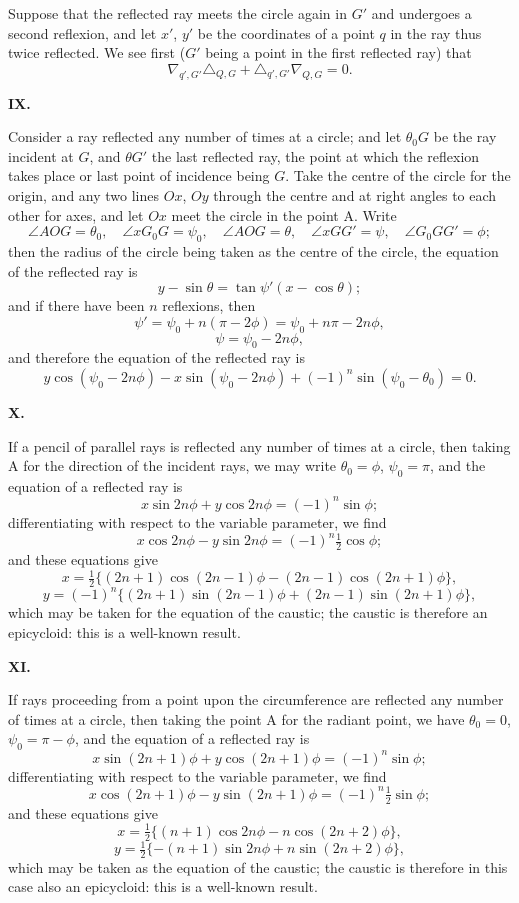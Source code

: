 \documentclass[11pt,a4paper]{book}
\begin{document}
\begin{center}
Suppose that the reflected ray meets the circle again in $G'$ and undergoes a
second reflexion, and let $x'$, $y'$ be the coordinates of a point $q$ in the ray thus
twice reflected. We see first ($G'$ being a point in the first reflected ray) that
\[\nabla_{q',G'}\triangle_{Q,G} + \triangle_{q',G'}\nabla_{Q,G} = 0.\]

\medskip
\noindent\textbf{IX.}

Consider a ray reflected any number of times at a circle; and let $\theta_0G$
be the ray incident at $G$, and $\theta G'$ the last reflected ray, the point at which
the reflexion takes place or last point of incidence being $G$. Take the centre of
the circle for the origin, and any two lines $Ox$, $Oy$ through the centre and at
right angles to each other for axes, and let $Ox$ meet the circle in the point A.
Write
\[\angle AOG = \theta_0,\quad \angle xG_0G = \psi_0,\quad \angle AOG = \theta,\quad \angle xGG' = \psi,\quad \angle G_0GG' = \phi;\]
then the radius of the circle being taken as the centre of the circle, the equation
of the reflected ray is
\[y - \sin\theta = \tan\psi'(x - \cos\theta);\]
and if there have been $n$ reflexions, then
\[\psi' = \psi_0 + n(\pi - 2\phi) = \psi_0 + n\pi - 2n\phi,\]
\[\psi = \psi_0 - 2n\phi,\]
and therefore the equation of the reflected ray is
\[y\cos(\psi_0 - 2n\phi) - x\sin(\psi_0 - 2n\phi) + (-1)^n\sin(\psi_0 - \theta_0) = 0.\]

\medskip
\noindent\textbf{X.}

If a pencil of parallel rays is reflected any number of times at a circle, then
taking A for the direction of the incident rays, we may write $\theta_0 = \phi$,
$\psi_0 = \pi$, and the equation of a reflected ray is
\[x\sin 2n\phi + y\cos 2n\phi = (-1)^n\sin\phi;\]
differentiating with respect to the variable parameter, we find
\[x\cos 2n\phi - y\sin 2n\phi = (-1)^n\tfrac{1}{2}\cos\phi;\]
and these equations give
\[x = \tfrac{1}{2}\{(2n+1)\cos(2n-1)\phi - (2n-1)\cos(2n+1)\phi\},\]
\[y = (-1)^n\{(2n+1)\sin(2n-1)\phi + (2n-1)\sin(2n+1)\phi\},\]
which may be taken for the equation of the caustic; the caustic is therefore an
epicycloid: this is a well-known result.

\medskip
\noindent\textbf{XI.}

If rays proceeding from a point upon the circumference are reflected any
number of times at a circle, then taking the point A for the radiant point, we
have $\theta_0 = 0$, $\psi_0 = \pi - \phi$, and the equation of a reflected ray is
\[x\sin(2n+1)\phi + y\cos(2n+1)\phi = (-1)^n\sin\phi;\]
differentiating with respect to the variable parameter, we find
\[x\cos(2n+1)\phi - y\sin(2n+1)\phi = (-1)^n\tfrac{1}{2}\sin\phi;\]
and these equations give
\[x = \tfrac{1}{2}\{(n+1)\cos 2n\phi - n\cos(2n+2)\phi\},\]
\[y = \tfrac{1}{2}\{-(n+1)\sin 2n\phi + n\sin(2n+2)\phi\},\]
which may be taken as the equation of the caustic; the caustic is therefore in this
case also an epicycloid: this is a well-known result.


\end{center}
\end{document}
